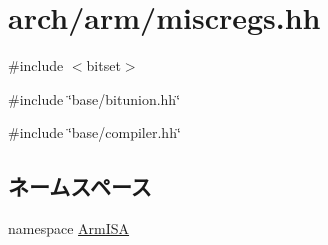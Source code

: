 \hypertarget{arm_2miscregs_8hh}{
\section{arch/arm/miscregs.hh}
\label{arm_2miscregs_8hh}
}
{\ttfamily \#include $<$bitset$>$}\par
{\ttfamily \#include \char`\"{}base/bitunion.hh\char`\"{}}\par
{\ttfamily \#include \char`\"{}base/compiler.hh\char`\"{}}\par
\subsection*{ネームスペース}
\begin{DoxyCompactItemize}
\item 
namespace \hyperlink{namespaceArmISA}{ArmISA}
\end{DoxyCompactItemize}

